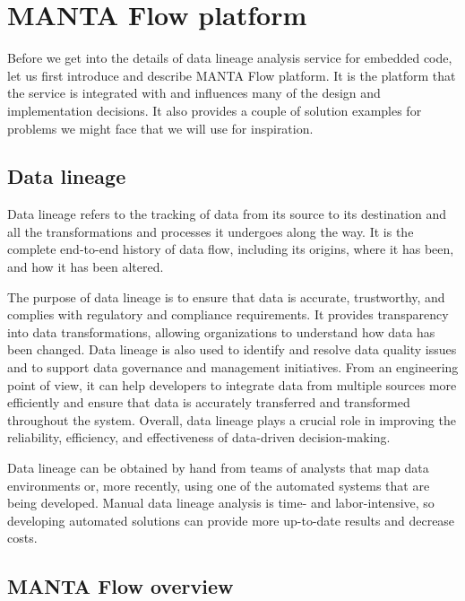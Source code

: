 \chapter{MANTA Flow platform}

Before we get into the details of data lineage analysis service for embedded code, let us first introduce and describe MANTA Flow platform. It is the platform that the service is integrated with and influences many of the design and implementation decisions. It also provides a couple of solution examples for problems we might face that we will use for inspiration.

\section{Data lineage}

Data lineage refers to the tracking of data from its source to its destination and all the transformations and processes it undergoes along the way. It is the complete end-to-end history of data flow, including its origins, where it has been, and how it has been altered.
\par
The purpose of data lineage is to ensure that data is accurate, trustworthy, and complies with regulatory and compliance requirements. It provides transparency into data transformations, allowing organizations to understand how data has been changed. Data lineage is also used to identify and resolve data quality issues and to support data governance and management initiatives. From an engineering point of view, it can help developers to integrate data from multiple sources more efficiently and ensure that data is accurately transferred and transformed throughout the system. Overall, data lineage plays a crucial role in improving the reliability, efficiency, and effectiveness of data-driven decision-making.
\par
Data lineage can be obtained by hand from teams of analysts that map data environments or, more recently, using one of the automated systems that are being developed. Manual data lineage analysis is time- and labor-intensive, so developing automated solutions can provide more up-to-date results and decrease costs.

\section{MANTA Flow overview}

